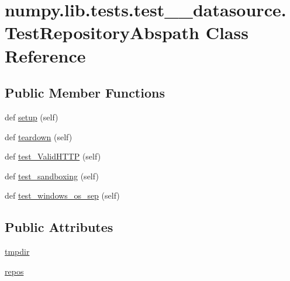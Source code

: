 \hypertarget{classnumpy_1_1lib_1_1tests_1_1test____datasource_1_1TestRepositoryAbspath}{}\section{numpy.\+lib.\+tests.\+test\+\_\+\+\_\+datasource.\+Test\+Repository\+Abspath Class Reference}
\label{classnumpy_1_1lib_1_1tests_1_1test____datasource_1_1TestRepositoryAbspath}
\subsection*{Public Member Functions}
\begin{DoxyCompactItemize}
\item 
def \hyperlink{classnumpy_1_1lib_1_1tests_1_1test____datasource_1_1TestRepositoryAbspath_af442e25c9cc5d00d2218f066a061098e}{setup} (self)
\item 
def \hyperlink{classnumpy_1_1lib_1_1tests_1_1test____datasource_1_1TestRepositoryAbspath_aa972a25fe02dcf35f7b259d65434cb4d}{teardown} (self)
\item 
def \hyperlink{classnumpy_1_1lib_1_1tests_1_1test____datasource_1_1TestRepositoryAbspath_afd634e1e2b49fc3b2d1f372bbecdbf37}{test\+\_\+\+Valid\+H\+T\+TP} (self)
\item 
def \hyperlink{classnumpy_1_1lib_1_1tests_1_1test____datasource_1_1TestRepositoryAbspath_adc0c073141050f9ab833cd92ebc1ad76}{test\+\_\+sandboxing} (self)
\item 
def \hyperlink{classnumpy_1_1lib_1_1tests_1_1test____datasource_1_1TestRepositoryAbspath_a4b9ebbe9f861a8d13d5d73d76ab9b960}{test\+\_\+windows\+\_\+os\+\_\+sep} (self)
\end{DoxyCompactItemize}
\subsection*{Public Attributes}
\begin{DoxyCompactItemize}
\item 
\hyperlink{classnumpy_1_1lib_1_1tests_1_1test____datasource_1_1TestRepositoryAbspath_a139ed5e26a6571400d14341395b3e4d1}{tmpdir}
\item 
\hyperlink{classnumpy_1_1lib_1_1tests_1_1test____datasource_1_1TestRepositoryAbspath_a4615037ef00ac2f26704859b5912c6ea}{repos}
\end{DoxyCompactItemize}


